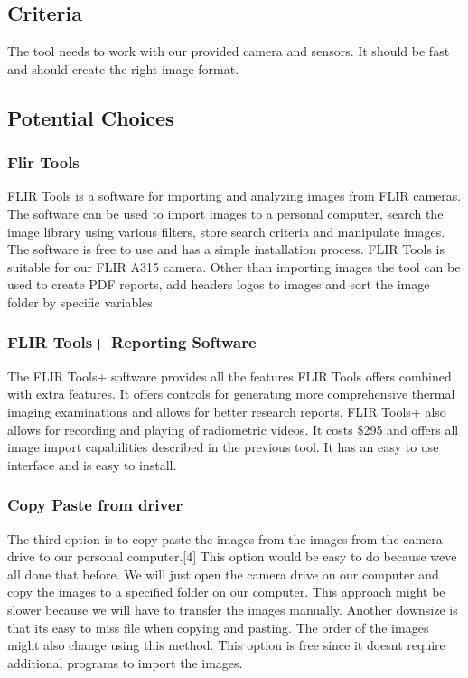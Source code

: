 	\subsection*{Criteria}
	The tool needs to work with our provided camera and sensors. It should be fast and should create the right image
	format.
	
	\subsection*{Potential Choices}
		\subsubsection*{Flir Tools}
			FLIR Tools is a software for importing and analyzing images from FLIR cameras. The software can be used to import
			images to a personal computer, search the image library using various filters, store search criteria and manipulate
			images. The software is free to use and has a simple installation process. FLIR Tools is suitable for our FLIR A315
			camera. Other than importing images the tool can be used to create PDF reports, add headers logos to images and sort
			the image folder by specific variables
		\subsubsection*{FLIR Tools+ Reporting Software}
			The FLIR Tools+ software provides all the features FLIR Tools offers combined with extra features. It offers controls for
			generating more comprehensive thermal imaging examinations and allows for better research reports. FLIR Tools+ also
			allows for recording and playing of radiometric videos. It costs \$295 and offers all image import capabilities described
			in the previous tool. It has an easy to use interface and is easy to install.
		\subsubsection*{Copy Paste from driver}
			The third option is to copy paste the images from the images from the camera drive to our personal computer.[4] This
			option would be easy to do because weve all done that before. We will just open the camera drive on our computer
			and copy the images to a specified folder on our computer. This approach might be slower because we will have to
			transfer the images manually. Another downsize is that its easy to miss file when copying and pasting. The order of the
			images might also change using this method. This option is free since it doesnt require additional programs to import
			the images.
